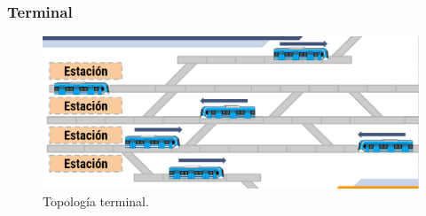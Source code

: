 \subsubsection{Terminal}

\lipsum[1]

    \begin{figure}[h]
        \centering
        \includegraphics[width=1\textwidth]{Figuras/terminal}
        \centering\caption{Topología terminal.}
        \label{fig:terminal_1}
    \end{figure}
    
\lipsum[1]